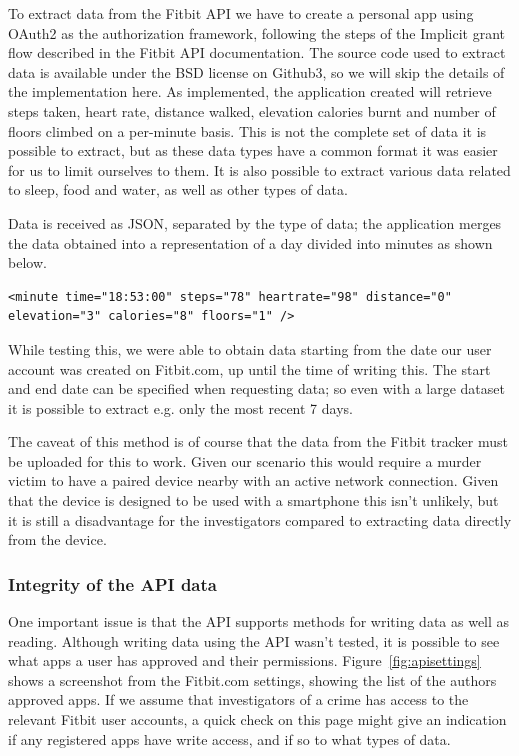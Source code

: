 \documentclass[a4paper,11pt,dvips]{article}
\begin{document}
To extract data from the Fitbit API we have to create a personal app using OAuth2 as the authorization framework, following the steps of the Implicit grant flow described in the Fitbit API documentation. The source code used to extract data is available under the BSD license on Github3, so we will skip the details of the implementation here. As implemented, the application created will retrieve steps taken, heart rate, distance walked, elevation calories burnt and number of floors climbed on a per-minute basis. This is not the complete set of data it is possible to extract, but as these data types have a common format it was easier for us to limit ourselves to them. It is also possible to extract various data related to sleep, food and water, as well as other types of data.

Data is received as JSON, separated by the type of data; the application merges the data obtained into a representation of a day divided into minutes as shown below.

\scriptsize
\begin{verbatim}
<minute time="18:53:00" steps="78" heartrate="98" distance="0" elevation="3" calories="8" floors="1" />
\end{verbatim}
\normalsize

While testing this, we were able to obtain data starting from the date our user account was created on Fitbit.com, up until the time of writing this. The start and end date can be specified when requesting data; so even with a large dataset it is possible to extract e.g. only the most recent 7 days.

The caveat of this method is of course that the data from the Fitbit tracker must be uploaded for this to work. Given our scenario this would require a murder victim to have a paired device nearby with an active network connection. Given that the device is designed to be used with a smartphone this isn't unlikely, but it is still a disadvantage for the investigators compared to extracting data directly from the device.

\subsubsection{Integrity of the API data}
One important issue is that the API supports methods for writing data as well as reading. Although writing data using the API wasn't tested, it is possible to see what apps a user has approved and their permissions. Figure~\ref{fig:apisettings} shows a screenshot from the Fitbit.com settings, showing the list of the authors approved apps. If we assume that investigators of a crime has access to the relevant Fitbit user accounts, a quick check on this page might give an indication if any registered apps have write access, and if so to what types of data.
\end{document}
